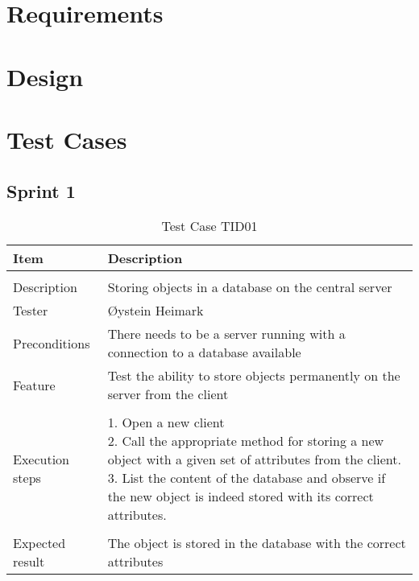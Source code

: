 \appendix

\clearpage

\setcounter{page}{1}

\chapter{Requirements}
\chapter{Design}


\chapter{Test Cases}
\section{Sprint 1}
\label{sec:sp1testcases}

\begin{table}[H]
\caption{Test Case TID01}
\centering
\begin{tabular}{ l p{13cm} }
\hline
 Item            & Description                                                              \\
\hline \\ [-2.0ex]
 Description     & Storing objects in a database on the central server                        \\
 Tester          & Øystein Heimark                  \\
 Preconditions   & There needs to be a server running with a connection to a database available \\
 Feature         & Test the ability to store objects permanently on the server from the client  \vspace{3pt}                     \\
\hline \\ [-1.5ex]
 Execution steps & \pbox{13cm}{1. Open a new client \\ 2. Call the appropriate method for storing a new object with a given set of attributes from the client. \\ 3. List the content of the database and observe if the new object is indeed stored with its correct attributes. } \vspace{3pt} \\
\hline \\ [-1.5ex]
 Expected result & The object is stored in the database with the correct attributes                                          \\
\hline
\end{tabular}
\label{table:testcasetid01}
\end{table}



